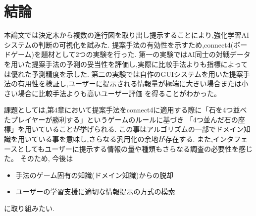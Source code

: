 \chapter{結論}

本論文では決定木から複数の進行図を取り出し提示することにより,強化学習AIシステムの判断の可視化を試みた.
提案手法の有効性を示すため,connect4(ボードゲーム)を題材として2つの実験を行った.
第一の実験ではAI同士の対戦データを用いた提案手法の予測の妥当性を評価し,実際に比較手法よりも指標によっては優れた予測精度を示した.
第二の実験では自作のGUIシステムを用いた提案手法の有用性を検証し,ユーザーに提示される情報量が極端に大きい場合または小さい場合に比較手法よりも高いユーザー評価
を得ることがわかった。

課題としては,第4章において提案手法をconnect4に適用する際に「石を4つ並べたプレイヤーが勝利する」というゲームのルールに基づき
「4つ並んだ石の座標」を用いていることが挙げられる.
この事はアルゴリズムの一部でドメイン知識を用いている事を意味し,さらなる汎用化の余地が存在する.
また,インタフェースとしてもユーザーに提示する情報の量や種類もさらなる調査の必要性を感じた。
そのため,
今後は
\begin{itemize}
	\item 手法のゲーム固有の知識(ドメイン知識)からの脱却
	\item ユーザーの学習支援に適切な情報提示の方式の模索
\end{itemize}


に取り組みたい.
